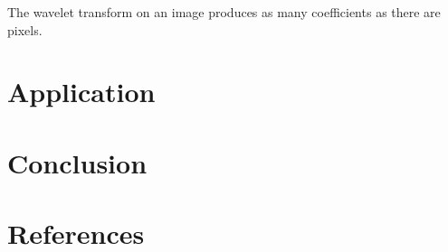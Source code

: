 \documentclass{article}
\begin{document}
The wavelet transform on an image produces as many coefficients as there are pixels.


\section{Application}


\section{Conclusion}


\section{References}
\end{document}
